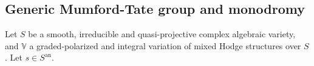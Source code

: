 \documentclass[10pt]{article}
\numberwithin{equation}{subsection}
\theoremstyle{plain}
\theoremstyle{definition}
\theoremstyle{remark}
\newcommand{\Z}{\mathbb Z}
\newcommand{\V}{\mathbb V}
\newcommand{\an}{\mathrm{an}}
\begin{document}
\subsection{Generic Mumford-Tate group and monodromy}\label{sect32}
Let $S$ be a smooth, irreducible and quasi-projective complex algebraic variety, and $\V$ a graded-polarized and integral variation of mixed Hodge structures over $S$. Let $s \in S^\an$. 
\end{document}
